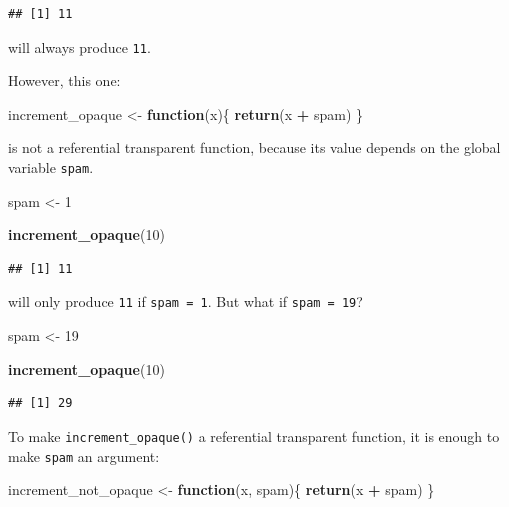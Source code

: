 \documentclass[]{gitbook}
\newenvironment{Shaded}{\begin{snugshade}}{\end{snugshade}}
\newcommand{\ControlFlowTok}[1]{\textcolor[rgb]{0.13,0.29,0.53}{\textbf{#1}}}
\newcommand{\DecValTok}[1]{\textcolor[rgb]{0.00,0.00,0.81}{#1}}
\newcommand{\KeywordTok}[1]{\textcolor[rgb]{0.13,0.29,0.53}{\textbf{#1}}}
\newcommand{\NormalTok}[1]{#1}
\newcommand{\OperatorTok}[1]{\textcolor[rgb]{0.81,0.36,0.00}{\textbf{#1}}}
\newcommand{\StringTok}[1]{\textcolor[rgb]{0.31,0.60,0.02}{#1}}
\begin{document}
\begin{verbatim}
## [1] 11
\end{verbatim}

will always produce \texttt{11}.

However, this one:

\begin{Shaded}
\begin{Highlighting}[]
\NormalTok{increment_opaque <-}\StringTok{ }\ControlFlowTok{function}\NormalTok{(x)\{}
    \KeywordTok{return}\NormalTok{(x }\OperatorTok{+}\StringTok{ }\NormalTok{spam)}
\NormalTok{\}}
\end{Highlighting}
\end{Shaded}

is not a referential transparent function, because its value depends on the global variable \texttt{spam}.

\begin{Shaded}
\begin{Highlighting}[]
\NormalTok{spam <-}\StringTok{ }\DecValTok{1}

\KeywordTok{increment_opaque}\NormalTok{(}\DecValTok{10}\NormalTok{)}
\end{Highlighting}
\end{Shaded}

\begin{verbatim}
## [1] 11
\end{verbatim}

will only produce \texttt{11} if \texttt{spam\ =\ 1}. But what if \texttt{spam\ =\ 19}?

\begin{Shaded}
\begin{Highlighting}[]
\NormalTok{spam <-}\StringTok{ }\DecValTok{19}

\KeywordTok{increment_opaque}\NormalTok{(}\DecValTok{10}\NormalTok{)}
\end{Highlighting}
\end{Shaded}

\begin{verbatim}
## [1] 29
\end{verbatim}

To make \texttt{increment\_opaque()} a referential transparent function, it is enough to make \texttt{spam} an
argument:

\begin{Shaded}
\begin{Highlighting}[]
\NormalTok{increment_not_opaque <-}\StringTok{ }\ControlFlowTok{function}\NormalTok{(x, spam)\{}
    \KeywordTok{return}\NormalTok{(x }\OperatorTok{+}\StringTok{ }\NormalTok{spam)}
\NormalTok{\}}
\end{Highlighting}
\end{Shaded}
\end{document}
